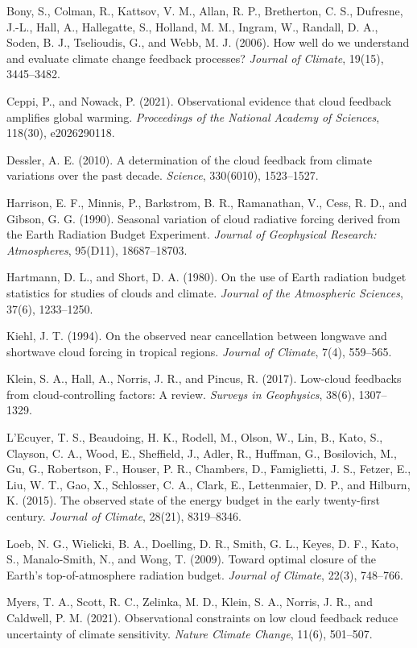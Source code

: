 Bony, S., Colman, R., Kattsov, V. M., Allan, R. P., Bretherton, C. S., Dufresne, J.-L., Hall, A., Hallegatte, S., Holland, M. M., Ingram, W., Randall, D. A., Soden, B. J., Tselioudis, G., and Webb, M. J. (2006). How well do we understand and evaluate climate change feedback processes? \textit{Journal of Climate}, 19(15), 3445--3482.

Ceppi, P., and Nowack, P. (2021). Observational evidence that cloud feedback amplifies global warming. \textit{Proceedings of the National Academy of Sciences}, 118(30), e2026290118.

Dessler, A. E. (2010). A determination of the cloud feedback from climate variations over the past decade. \textit{Science}, 330(6010), 1523--1527.

Harrison, E. F., Minnis, P., Barkstrom, B. R., Ramanathan, V., Cess, R. D., and Gibson, G. G. (1990). Seasonal variation of cloud radiative forcing derived from the Earth Radiation Budget Experiment. \textit{Journal of Geophysical Research: Atmospheres}, 95(D11), 18687--18703.

Hartmann, D. L., and Short, D. A. (1980). On the use of Earth radiation budget statistics for studies of clouds and climate. \textit{Journal of the Atmospheric Sciences}, 37(6), 1233--1250.

Kiehl, J. T. (1994). On the observed near cancellation between longwave and shortwave cloud forcing in tropical regions. \textit{Journal of Climate}, 7(4), 559--565.

Klein, S. A., Hall, A., Norris, J. R., and Pincus, R. (2017). Low-cloud feedbacks from cloud-controlling factors: A review. \textit{Surveys in Geophysics}, 38(6), 1307--1329.

L'Ecuyer, T. S., Beaudoing, H. K., Rodell, M., Olson, W., Lin, B., Kato, S., Clayson, C. A., Wood, E., Sheffield, J., Adler, R., Huffman, G., Bosilovich, M., Gu, G., Robertson, F., Houser, P. R., Chambers, D., Famiglietti, J. S., Fetzer, E., Liu, W. T., Gao, X., Schlosser, C. A., Clark, E., Lettenmaier, D. P., and Hilburn, K. (2015). The observed state of the energy budget in the early twenty-first century. \textit{Journal of Climate}, 28(21), 8319--8346.

Loeb, N. G., Wielicki, B. A., Doelling, D. R., Smith, G. L., Keyes, D. F., Kato, S., Manalo-Smith, N., and Wong, T. (2009). Toward optimal closure of the Earth's top-of-atmosphere radiation budget. \textit{Journal of Climate}, 22(3), 748--766.

Myers, T. A., Scott, R. C., Zelinka, M. D., Klein, S. A., Norris, J. R., and Caldwell, P. M. (2021). Observational constraints on low cloud feedback reduce uncertainty of climate sensitivity. \textit{Nature Climate Change}, 11(6), 501--507.

